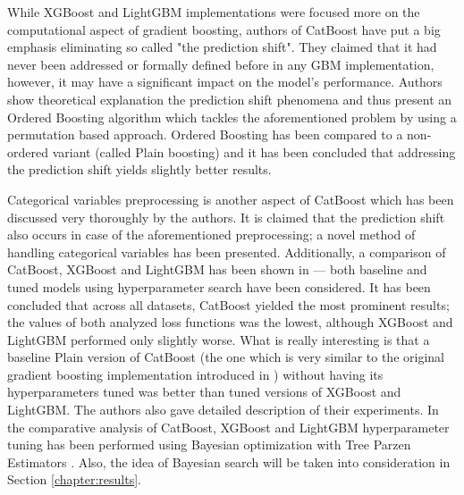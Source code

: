 \documentclass[magisterska, english]{pwr_wmat_praca_dyplomowa}
\theoremstyle{plain}
\numberwithin{theorem}{chapter}
\theoremstyle{definition}
\numberwithin{theorem}{chapter}
\begin{document}
While XGBoost \cite{xgboost} and LightGBM \cite{lightgbm} implementations were focused more on the computational aspect of gradient boosting, authors of CatBoost \cite{catboost} have put a big emphasis eliminating so called "the prediction shift". They claimed that it had never been addressed or formally defined before in any GBM implementation, however, it may have a significant impact on the model's performance. Authors show theoretical explanation the prediction shift phenomena and thus present an Ordered Boosting algorithm which tackles the aforementioned problem by using a permutation based approach. Ordered Boosting has been compared to a non-ordered variant (called Plain boosting) and it has been concluded that addressing the prediction shift yields slightly better results. 

Categorical variables preprocessing is another aspect of CatBoost which has been discussed very thoroughly by the authors. It is claimed that the prediction shift also occurs in case of the aforementioned preprocessing; a novel method of handling categorical variables has been presented. Additionally, a comparison of CatBoost, XGBoost and LightGBM has been shown in \cite{catboost} --- both baseline and tuned models using hyperparameter search have been considered. It has been concluded that across all datasets, CatBoost yielded the most prominent results; the values of both analyzed loss functions was the lowest, although XGBoost and LightGBM performed only slightly worse. What is really interesting is that a baseline Plain version of CatBoost (the one which is very similar to the original gradient boosting implementation introduced in \cite{friedman_gbm}) without having its hyperparameters tuned was better than tuned versions of XGBoost and LightGBM.
The authors also gave detailed description of their experiments. In the comparative analysis of  CatBoost, XGBoost and LightGBM hyperparameter tuning has been performed using Bayesian optimization with Tree Parzen Estimators \cite{tpe}. Also, the idea of Bayesian search will be taken into consideration in Section \ref{chapter:results}.  %
\end{document}
